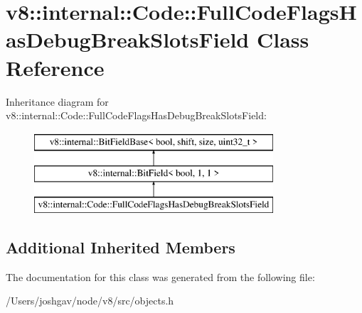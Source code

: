 \hypertarget{classv8_1_1internal_1_1_code_1_1_full_code_flags_has_debug_break_slots_field}{}\section{v8\+:\+:internal\+:\+:Code\+:\+:Full\+Code\+Flags\+Has\+Debug\+Break\+Slots\+Field Class Reference}
\label{classv8_1_1internal_1_1_code_1_1_full_code_flags_has_debug_break_slots_field}
Inheritance diagram for v8\+:\+:internal\+:\+:Code\+:\+:Full\+Code\+Flags\+Has\+Debug\+Break\+Slots\+Field\+:\begin{figure}[H]
\begin{center}
\leavevmode
\includegraphics[height=3.000000cm]{classv8_1_1internal_1_1_code_1_1_full_code_flags_has_debug_break_slots_field}
\end{center}
\end{figure}
\subsection*{Additional Inherited Members}


The documentation for this class was generated from the following file\+:\begin{DoxyCompactItemize}
\item 
/\+Users/joshgav/node/v8/src/objects.\+h\end{DoxyCompactItemize}
